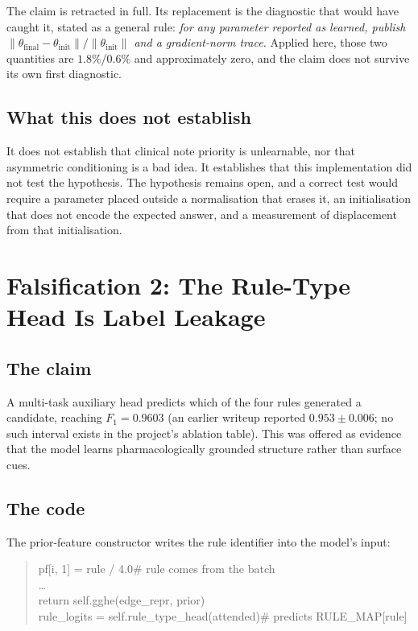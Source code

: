 The claim is retracted in full. Its replacement is the diagnostic that would
have caught it, stated as a general rule: \emph{for any parameter reported as
learned, publish $\lVert\theta_{\text{final}} - \theta_{\text{init}}\rVert /
\lVert\theta_{\text{init}}\rVert$ and a gradient-norm trace.} Applied here,
those two quantities are $1.8\%$/$0.6\%$ and approximately zero, and the claim
does not survive its own first diagnostic.

\subsection{What this does not establish}

It does not establish that clinical note priority is unlearnable, nor that
asymmetric conditioning is a bad idea. It establishes that this implementation
did not test the hypothesis. The hypothesis remains open, and a correct test
would require a parameter placed outside a normalisation that erases it, an
initialisation that does not encode the expected answer, and a measurement of
displacement from that initialisation.

\section{Falsification 2: The Rule-Type Head Is Label Leakage}
\label{sec:c2}

\subsection{The claim}

A multi-task auxiliary head predicts which of the four rules generated a
candidate, reaching $F_1 = 0.9603$ (an earlier writeup reported $0.953 \pm 0.006$; no such interval exists in the
project's ablation table). This was offered as evidence that the model learns
pharmacologically grounded structure rather than surface cues.

\subsection{The code}

The prior-feature constructor writes the rule identifier into the model's input:

\begin{quote}\ttfamily\small
pf[i, 1] = rule / 4.0\hfill\# rule comes from the batch \\
\ldots \\
return self.gghe(edge\_repr, prior) \\
rule\_logits = self.rule\_type\_head(attended)\hfill\# predicts RULE\_MAP[rule]
\end{quote}

